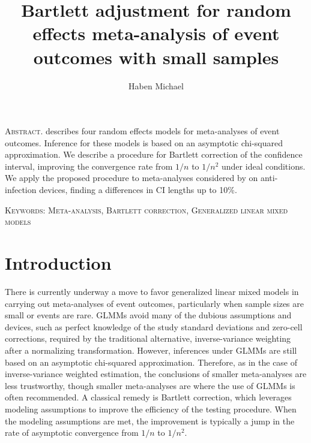 \documentclass[12pt]{article}
\title{Bartlett adjustment for random effects meta-analysis of event outcomes with small samples}
\author[1]{Haben Michael}
\affil[1]{University of Massachusetts, Amherst, MA (hmichael@math.umass.edu)}
\date{}
\newcommand{\n}{n}
\begin{document}
\maketitle

\textsc{Abstract.} \citet{stijnen:10} describes four random effects models for
meta-analyses of event outcomes. Inference for these models is based
on an asymptotic chi-squared approximation. We describe a procedure
for Bartlett correction of the confidence interval, improving the
convergence rate from $1/\n$ to $1/\n^2$ under ideal conditions. We
apply the proposed procedure to meta-analyses considered by \citet{stijnen:10} on anti-infection devices, finding a differences in CI lengths
up to 10\%.

\textsc{Keywords: Meta-analysis, Bartlett correction,
  Generalized linear mixed models}


\section{Introduction}
\label{sec:introduction}

There is currently underway a move to favor generalized linear mixed
models in carrying out meta-analyses of event outcomes, particularly
when sample sizes are small or events are rare. GLMMs avoid many of
the dubious assumptions and devices, such as perfect knowledge of the
study standard deviations and zero-cell corrections, required by the
traditional alternative, inverse-variance weighting after a normalizing transformation. %
However, inferences under GLMMs are still based on an asymptotic
chi-squared approximation. Therefore, as in the case of
inverse-variance weighted estimation, the conclusions of smaller
meta-analyses are less trustworthy, though smaller  meta-analyses are where the use
of GLMMs is often recommended. A classical remedy is Bartlett
correction, which leverages modeling assumptions to improve the
efficiency of the testing procedure. When the modeling assumptions
are met, the improvement is typically a jump in the rate of asymptotic
convergence from $1/\n$ to $1/\n^2$. 
\end{document}

